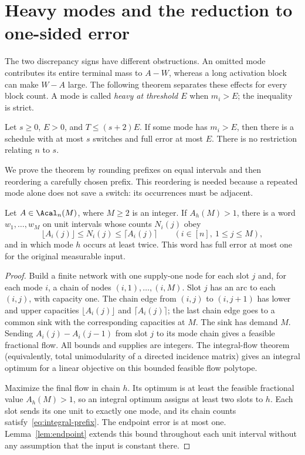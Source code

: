 \section{Heavy modes and the reduction to one-sided error}\label{sec:heavy}

The two discrepancy signs have different obstructions. An omitted mode
contributes its entire terminal mass to $A-W$, whereas a long activation
block can make $W-A$ large. The following theorem separates these effects
for every block count. A mode is called \emph{heavy at threshold $E$} when
$m_i>E$; the inequality is strict.

\begin{theorem}\label{thm:heavy}
Let $s\ge0$, $E>0$, and $T\le(s+2)E$. If some mode has $m_i>E$,
then there is a schedule with at most $s$ switches and full error at most $E$.
There is no restriction relating $n$ to $s$.
\end{theorem}

We prove the theorem by rounding prefixes on equal intervals and then
reordering a carefully chosen prefix. This reordering is needed because a
repeated mode alone does not save a switch: its occurrences must be adjacent.

\begin{lemma}\label{lem:prefix-repeat}
Let $A\in\Acal_n(M)$, where $M\ge2$ is an integer. If $A_h(M)>1$,
there is a word $w_1,\ldots,w_M$ on unit intervals whose counts $N_i(j)$ obey
\begin{equation}\label{eq:integral-prefix}
 \lfloor A_i(j)\rfloor\le N_i(j)\le\lceil A_i(j)\rceil
 \qquad(i\in[n],\ 1\le j\le M),
\end{equation}
and in which mode $h$ occurs at least twice. This word has full error at most
one for the original measurable input.
\end{lemma}
\begin{proof}
Build a finite network with one supply-one node for each slot $j$ and, for
each mode $i$, a chain of nodes $(i,1),\ldots,(i,M)$. Slot $j$ has an arc
to each $(i,j)$, with capacity one. The chain edge from $(i,j)$ to
$(i,j+1)$ has lower and upper capacities $\lfloor A_i(j)\rfloor$ and
$\lceil A_i(j)\rceil$; the last chain edge goes to a common sink with
the corresponding capacities at $M$. The sink has demand $M$. Sending
$A_i(j)-A_i(j-1)$ from slot $j$ to its mode chain gives a feasible
fractional flow. All bounds and supplies are integers. The integral-flow
theorem (equivalently, total unimodularity of a directed incidence matrix)
gives an integral optimum for a linear objective on this bounded feasible
flow polytope.

Maximize the final flow in chain $h$. Its optimum is at least the feasible
fractional value $A_h(M)>1$, so an integral optimum assigns at least two
slots to $h$. Each slot sends its one unit to exactly one mode, and its
chain counts satisfy~\eqref{eq:integral-prefix}. The endpoint error is at
most one. Lemma~\ref{lem:endpoint} extends this bound throughout each
unit interval without any assumption that the input is constant there.
\end{proof}

